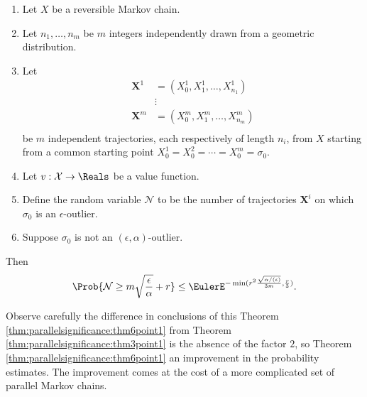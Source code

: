\documentclass[12pt]{article}
\begin{document}
\begin{theorem}
    \label{thm:parallelsignificance:thm6point1}
    \begin{enumerate}
        \item
            Let \( X \) be a reversible Markov chain.
        \item
            Let \( n_1, \dots, n_m \) be \( m \) integers independently
            drawn from a geometric distribution.
        \item
            Let
            \begin{align*}
                \mathbf{X}^1 &= (X_0^1, X_1^1, \dots, X_{n_1}^1 )\\
                &\vdots \\
                \mathbf{X}^m &= (X_0^m, X_1^m, \dots, X_{n_m}^m )\\
            \end{align*}
            be \( m \) independent trajectories, each respectively of
            length \( n_{i} \), from \( X \) starting from a common
            starting point \( X_0^1 = X_0^2 = \cdots = X_0^m = \sigma_0 \).
        \item
            Let \( v :  \mathcal{X} \to \Reals \) be a value function.
        \item
            Define the random variable \( \mathcal{N} \) to be the
            number of trajectories \( \mathbf{X}^i \) on which \( \sigma_0
            \) is an \( \epsilon \)-outlier.
        \item
            Suppose \( \sigma_0 \) is not an \( (\epsilon, \alpha) \)-outlier.
    \end{enumerate}
    Then
    \[
        \Prob{\mathcal{N} \ge m \sqrt{\frac{\epsilon}{\alpha}} + r} \le
        \EulerE^{-\min(r^2 \frac{\sqrt{\alpha/(\epsilon)}}{3m}, \frac{r}
        {3})}.
    \]
\end{theorem}

\begin{remark}
    Observe carefully the difference in conclusions of this Theorem~%
    \ref{thm:parallelsignificance:thm6point1} from Theorem~%
    \ref{thm:parallelsignificance:thm3point1} is the absence of the
    factor \( 2 \), so Theorem~%
    \ref{thm:parallelsignificance:thm6point1} an improvement in the
    probability estimates.  The improvement comes at the cost of a more
    complicated set of parallel Markov chains.
\end{remark}
\end{document}

